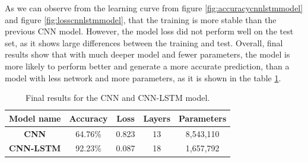 As we can observe from the learning curve from figure \ref{fig:accuracycnnlstmmodel} and figure \ref{fig:losscnnlstmmodel}, that the training is more stable than the previous CNN model. However, the model loss did not perform well on the test set, as it shows large differences between the training and test. Overall, final results show that with much deeper model and fewer parameters, the model is more likely to perform better and generate a more accurate prediction, than a model with less network and more parameters, as it is shown in the table \ref{table:finalresults}.
\begin{table}[ht]
\caption{Final results for the CNN and CNN-LSTM model.}
\centering
\begin{tabular}{|c|c|c|c|c|}
\hline
\textbf{Model name} & \textbf{Accuracy} & \textbf{Loss} & \textbf{Layers} & \textbf{Parameters} \\ \hline
\textbf{CNN} & 64.76\% & 0.823 & 13 & 8,543,110 \\ \hline
\textbf{CNN-LSTM} & 92.23\% & 0.087 & 18 & 1,657,792 \\ \hline
\end{tabular}

\label{table:finalresults}
\end{table}\\


